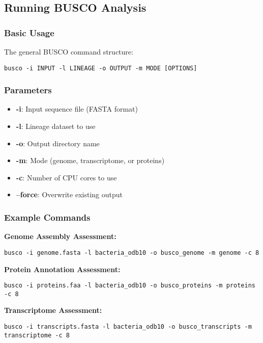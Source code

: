 \subsection{Running BUSCO Analysis}

\subsubsection{Basic Usage}
The general BUSCO command structure:
\begin{verbatim}
busco -i INPUT -l LINEAGE -o OUTPUT -m MODE [OPTIONS]
\end{verbatim}

\subsubsection{Parameters}
\begin{itemize}
    \item \textbf{-i}: Input sequence file (FASTA format)
    \item \textbf{-l}: Lineage dataset to use
    \item \textbf{-o}: Output directory name
    \item \textbf{-m}: Mode (genome, transcriptome, or proteins)
    \item \textbf{-c}: Number of CPU cores to use
    \item \textbf{--force}: Overwrite existing output
\end{itemize}

\subsubsection{Example Commands}

\textbf{Genome Assembly Assessment:}
\begin{verbatim}
busco -i genome.fasta -l bacteria_odb10 -o busco_genome -m genome -c 8
\end{verbatim}

\textbf{Protein Annotation Assessment:}
\begin{verbatim}
busco -i proteins.faa -l bacteria_odb10 -o busco_proteins -m proteins -c 8
\end{verbatim}

\textbf{Transcriptome Assessment:}
\begin{verbatim}
busco -i transcripts.fasta -l bacteria_odb10 -o busco_transcripts -m transcriptome -c 8
\end{verbatim}

